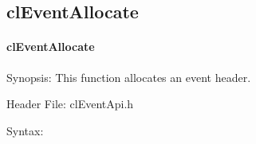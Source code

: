 \begin{flushleft}
\subsection{clEventAllocate}
\hypertarget{pageem107}{}\paragraph{cl\-Event\-Allocate}\label{pageem107}
\begin{Desc}
\item[Synopsis:]This function allocates an event header.
\end{Desc}
\begin{Desc}
\item[Header File:]clEventApi.h\end{Desc}
\begin{Desc}
\item[Syntax:]


\end{Desc}
\end{flushleft}
